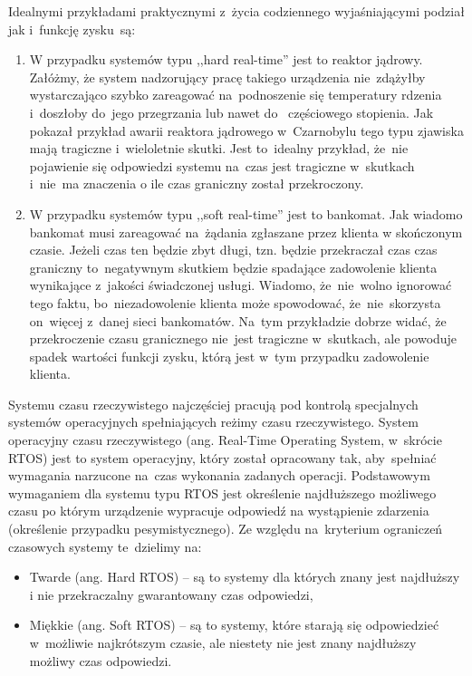 Idealnymi przykładami praktycznymi z~życia codziennego wyjaśniającymi podział jak i~funkcję zysku~są:
\begin{enumerate}
\item W przypadku systemów typu  ,,hard real-time'' jest to reaktor jądrowy. Załóżmy, że system nadzorujący pracę takiego urządzenia nie~zdążyłby wystarczająco szybko zareagować na~podnoszenie się temperatury rdzenia i~doszłoby do~jego przegrzania lub nawet do~ częściowego stopienia. Jak pokazał przykład awarii reaktora jądrowego w~Czarnobylu tego typu zjawiska mają tragiczne i~wieloletnie skutki. Jest to~idealny przykład, że~nie pojawienie się odpowiedzi systemu na~czas jest tragiczne w~skutkach i~nie~ma znaczenia o ile czas graniczny został przekroczony.
\item W przypadku systemów typu  ,,soft real-time'' jest to bankomat. Jak wiadomo bankomat musi zareagować na~żądania zgłaszane przez klienta w skończonym czasie. Jeżeli czas ten będzie zbyt długi, tzn. będzie przekraczał czas czas graniczny to~negatywnym skutkiem będzie spadające zadowolenie klienta wynikające z~jakości świadczonej usługi. Wiadomo, że~nie~wolno ignorować tego faktu, bo~niezadowolenie klienta może spowodować, że~nie~skorzysta on~więcej z~danej sieci bankomatów. Na~tym przykładzie dobrze widać, że przekroczenie czasu granicznego nie~jest tragiczne w~skutkach, ale powoduje spadek wartości funkcji zysku, którą jest w~tym przypadku zadowolenie klienta.
\end{enumerate}

Systemu czasu rzeczywistego najczęściej pracują pod kontrolą specjalnych systemów operacyjnych spełniających reżimy czasu rzeczywistego. System operacyjny czasu rzeczywistego (ang. Real-Time Operating System, w~skrócie RTOS) jest to system operacyjny, który został opracowany tak, aby~spełniać wymagania narzucone na~czas wykonania zadanych operacji. Podstawowym wymaganiem dla systemu typu RTOS jest określenie najdłuższego możliwego czasu po którym urządzenie wypracuje odpowiedź na wystąpienie zdarzenia (określenie przypadku pesymistycznego). Ze względu na~kryterium ograniczeń czasowych systemy te~dzielimy na:
\begin{itemize}
\item Twarde (ang. Hard RTOS) -- są to systemy dla których znany jest najdłuższy i nie przekraczalny gwarantowany czas odpowiedzi,
\item Miękkie (ang. Soft RTOS) -- są to systemy, które starają się odpowiedzieć w~możliwie najkrótszym czasie, ale niestety nie jest znany najdłuższy możliwy czas odpowiedzi.
\end{itemize}

